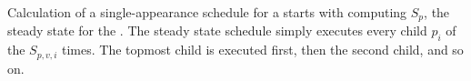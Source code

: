 \begin{comment}
Computing the amount of data peeked by the {\pipeline} during
initialization may be a little more complicated, because unlike
popping and pushing, peeking is not accumulative. Luckily, we can
rely on our knowledge of structure of the {\StreamIt} graph to
calculate the amount of data peeked by a {\pipeline}. We know that a
{\pipeline} is a single-input structure. We also know that this
single input will lead directly into a {\StreamIt} node.  There are
only three possibilities for what this node will be.

\begin{itemize}
\item If {\pipeline}'s first node is a {\filter} $f$ (the first child
of the {\pipeline} is a {\filter} or a {\pipeline} with a {\filter} as its
first node) then the extra amount of data peeked by the {\pipeline}
on initialization will be $e^i_f - o^i_f$. If the first child is a
{\filter}, then $p_0$ is $f$ and the extra amount peeked is also
$e^i_{p_0} - o^i_{p_0}$.  If the first child is a {\pipeline} with a
{\filter} first node, we can show by induction that this {\pipeline}'s
extra peek amount will also be $e^i_{p_0} - o^i_{p_0}$.

\item If {\pipeline}'s first node is a {\splitter} (the first child of
the {\pipeline} is a {\splitjoin} or a {\pipeline} with a {\splitter} as
its first node) then the extra amount of data peeked by the
{\pipeline} on initialization will be 0, because {\splitters} never
peek. Furthermore, for the same reason, the amount of extra data
peeked by the first child on its initialization will also be zero,
or $e^i_{p_0} - o^i_{p_0}= 0$.

\item If {\pipeline}'s first node is a {\joiner} (the first child of
the {\pipeline} is a {\feedbackloop} or a {\pipeline} with a {\joiner} as
its first node) then the amount of extra data peeked by the
{\pipeline} on initialization will be 0, for the same reasons as
above. And again $e^i_{p_0} - o^i_{p_0}= 0$.
\end{itemize}

Thus on initialization, the {\pipeline} will have an extra peek
amount of $e^i_{p_0} - o^i_{p_0}$, and the total amount of data
peeked by the {\pipeline} for initialization is $e^i_p = (e^i_{p_0}
- o^i_{p_0}) + l_0
* o_{p_0}$.
\end{comment}

\begin{comment}
The steady state state schedule is calculated as a
single-appearance schedule.
\end{comment}
Calculation of a single-appearance schedule for a {\pipeline} starts
with computing $S_p$, the steady state for the {\pipeline}. The
steady state schedule simply executes every child $p_i$ of the
{\pipeline} $S_{p,v,i}$ times. The topmost child is executed first,
then the second child, and so on.

